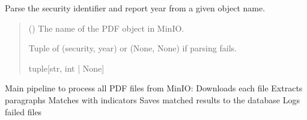 \documentclass[letterpaper,10pt,english]{sphinxmanual}
\begin{document}
\begin{fulllineitems}
\label{\detokenize{modules.data_storage:modules.data_storage.paragraph_extraction.parse_security_and_year}}
\pysigstartsignatures
\pysiglinewithargsret
{}
{}
{}
\pysigstopsignatures
\sphinxAtStartPar
Parse the security identifier and report year from a given object name.
\begin{quote}\begin{description}
\sphinxAtStartPar
{} () \textendash{} The name of the PDF object in MinIO.

\sphinxAtStartPar
Tuple of (security, year) or (None, None) if parsing fails.

\sphinxAtStartPar
tuple{[}str, int | None{]}

\end{description}\end{quote}

\end{fulllineitems}


\begin{fulllineitems}
\label{\detokenize{modules.data_storage:modules.data_storage.paragraph_extraction.process_all_pdfs}}
\pysigstartsignatures
\pysiglinewithargsret
{}
{}
{}
\pysigstopsignatures
\sphinxAtStartPar
Main pipeline to process all PDF files from MinIO:
\sphinxhyphen{} Downloads each file
\sphinxhyphen{} Extracts paragraphs
\sphinxhyphen{} Matches with indicators
\sphinxhyphen{} Saves matched results to the database
\sphinxhyphen{} Logs failed files

\end{fulllineitems}

\end{document}
